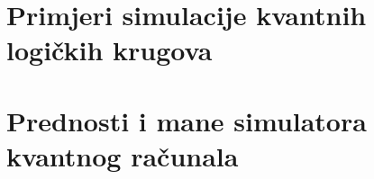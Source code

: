\section{Primjeri simulacije kvantnih logičkih krugova}

\section{Prednosti i mane simulatora kvantnog računala}
































